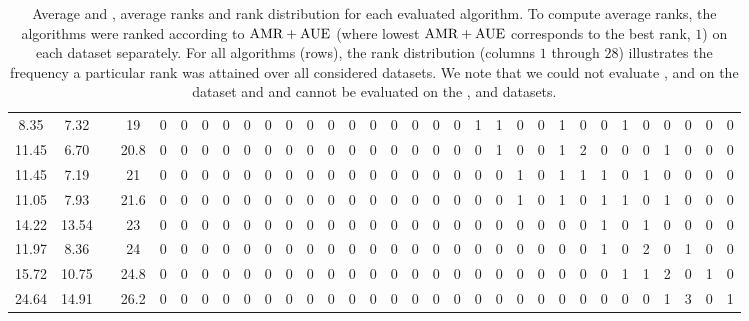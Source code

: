 \begin{table*}[ht]
{\begin{tabular}{| c | c || c || c | cccccccccccccccccccccccccccc |}
		8.35 & 7.32 & \RW & 19 & 0 & 0 & 0 & 0 & 0 & 0 & 0 & 0 & 0 & 0 & 0 & 0 & 0 & 0 & 0 & \cellcolor{black!25}1 & \cellcolor{black!25}1 & 0 & 0 & \cellcolor{black!25}1 & 0 & 0 & \cellcolor{black!25}1 & 0 & 0 & 0 & 0 & 0\\
		11.45 & 6.70 & \CIS & 20.8 & 0 & 0 & 0 & 0 & 0 & 0 & 0 & 0 & 0 & 0 & 0 & 0 & 0 & 0 & 0 & 0 & \cellcolor{black!25}1 & 0 & 0 & \cellcolor{black!25}1 & \cellcolor{black!35}2 & 0 & 0 & 0 & \cellcolor{black!25}1 & 0 & 0 & 0\\
		11.45 & 7.19 & \TPS & 21 & 0 & 0 & 0 & 0 & 0 & 0 & 0 & 0 & 0 & 0 & 0 & 0 & 0 & 0 & 0 & 0 & 0 & \cellcolor{black!25}1 & 0 & \cellcolor{black!25}1 & \cellcolor{black!25}1 & \cellcolor{black!25}1 & 0 & \cellcolor{black!25}1 & 0 & 0 & 0 & 0\\
		11.05 & 7.93 & \TP & 21.6 & 0 & 0 & 0 & 0 & 0 & 0 & 0 & 0 & 0 & 0 & 0 & 0 & 0 & 0 & 0 & 0 & 0 & \cellcolor{black!25}1 & 0 & \cellcolor{black!25}1 & 0 & \cellcolor{black!25}1 & \cellcolor{black!25}1 & 0 & \cellcolor{black!25}1 & 0 & 0 & 0\\
		14.22 & 13.54 & \VCCS & 23 & 0 & 0 & 0 & 0 & 0 & 0 & 0 & 0 & 0 & 0 & 0 & 0 & 0 & 0 & 0 & 0 & 0 & 0 & 0 & 0 & 0 & \cellcolor{black!25}1 & 0 & \cellcolor{black!25}1 & 0 & 0 & 0 & 0\\
		11.97 & 8.36 & \SEAW & 24 & 0 & 0 & 0 & 0 & 0 & 0 & 0 & 0 & 0 & 0 & 0 & 0 & 0 & 0 & 0 & 0 & 0 & 0 & 0 & 0 & 0 & \cellcolor{black!25}1 & 0 & \cellcolor{black!35}2 & 0 & \cellcolor{black!25}1 & 0 & 0\\
		15.72 & 10.75 & \QS & 24.8 & 0 & 0 & 0 & 0 & 0 & 0 & 0 & 0 & 0 & 0 & 0 & 0 & 0 & 0 & 0 & 0 & 0 & 0 & 0 & 0 & 0 & 0 & \cellcolor{black!25}1 & \cellcolor{black!25}1 & \cellcolor{black!35}2 & 0 & \cellcolor{black!25}1 & 0\\
		24.64 & 14.91 & \PF & 26.2 & 0 & 0 & 0 & 0 & 0 & 0 & 0 & 0 & 0 & 0 & 0 & 0 & 0 & 0 & 0 & 0 & 0 & 0 & 0 & 0 & 0 & 0 & 0 & 0 & \cellcolor{black!25}1 & \cellcolor{black!45}3 & 0 & \cellcolor{black!25}1\\
		\hline
	\end{tabular}
	}
	\caption{Average \ARec and \AUE, average ranks and rank distribution for each evaluated algorithm.
	To compute average ranks, the algorithms were ranked according to $\text{AMR} + \text{AUE}$ 
	(where lowest $\text{AMR} + \text{AUE}$ corresponds to the best rank, \ie $1$)
	on each dataset separately.
	For all algorithms (rows), the rank distribution (columns $1$ through $28$) illustrates the frequency 
	a particular rank was attained over all considered datasets.
	We note that we could not evaluate \RW, \NC and \SEAW on the \SUNRGBD dataset and
	\DASP and \VCCS cannot be evaluated on the \BSDS, \SBD and \Fash datasets.}
	\label{table:ranking}
\end{table*}

